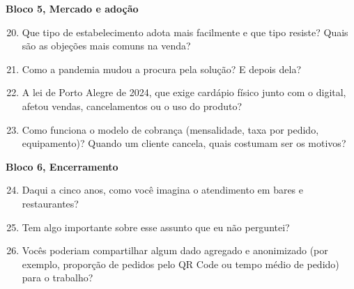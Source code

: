 \noindent\textbf{Bloco 5, Mercado e adoção}
\begin{enumerate}\setcounter{enumi}{19}
	\item Que tipo de estabelecimento adota mais facilmente e que tipo resiste? Quais são as objeções mais comuns na venda?
	\item Como a pandemia mudou a procura pela solução? E depois dela?
	\item A lei de Porto Alegre de 2024, que exige cardápio físico junto com o digital, afetou vendas, cancelamentos ou o uso do produto?
	\item Como funciona o modelo de cobrança (mensalidade, taxa por pedido, equipamento)? Quando um cliente cancela, quais costumam ser os motivos?
\end{enumerate}

\noindent\textbf{Bloco 6, Encerramento}
\begin{enumerate}\setcounter{enumi}{23}
	\item Daqui a cinco anos, como você imagina o atendimento em bares e restaurantes?
	\item Tem algo importante sobre esse assunto que eu não perguntei?
	\item Vocês poderiam compartilhar algum dado agregado e anonimizado (por exemplo, proporção de pedidos pelo QR Code ou tempo médio de pedido) para o trabalho?
\end{enumerate}
